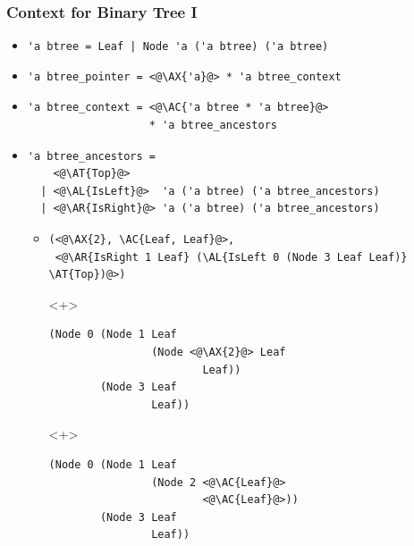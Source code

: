 \begin{frame}[fragile]
\frametitle{Context for Binary Tree I}

\newcommand{\AX}[1]{\textcolor{red}{#1}}
\newcommand{\AC}[1]{\textcolor{blue}{#1}}
\newcommand{\AL}[1]{\textcolor[RGB]{0,170,0}{#1}}
\newcommand{\AR}[1]{\textcolor{cyan}{#1}}
\newcommand{\AT}[1]{\textcolor{gray}{#1}}

\begin{itemize}[<+->]
\item \lstinline.'a btree = Leaf | Node 'a ('a btree) ('a btree).

\item
\begin{lstlisting}
'a btree_pointer = <@\AX{'a}@> * 'a btree_context
\end{lstlisting}

\item
\begin{lstlisting}
'a btree_context = <@\AC{'a btree * 'a btree}@>
                   * 'a btree_ancestors
\end{lstlisting}

\item
\begin{lstlisting}
'a btree_ancestors =
    <@\AT{Top}@>
  | <@\AL{IsLeft}@>  'a ('a btree) ('a btree_ancestors)
  | <@\AR{IsRight}@> 'a ('a btree) ('a btree_ancestors)
\end{lstlisting}

\begin{itemize}
\item
\begin{lstlisting}
(<@\AX{2}, \AC{Leaf, Leaf}@>,
 <@\AR{IsRight 1 Leaf} (\AL{IsLeft 0 (Node 3 Leaf Leaf)} \AT{Top})@>)
\end{lstlisting}

\begin{onlyenv}<+>
\begin{lstlisting}
(Node 0 (Node 1 Leaf
                (Node <@\AX{2}@> Leaf
                        Leaf))
        (Node 3 Leaf
                Leaf))
\end{lstlisting}
\end{onlyenv}

\begin{onlyenv}<+>
\begin{lstlisting}
(Node 0 (Node 1 Leaf
                (Node 2 <@\AC{Leaf}@>
                        <@\AC{Leaf}@>))
        (Node 3 Leaf
                Leaf))
\end{lstlisting}
\end{onlyenv}


\end{itemize}
\end{itemize}
\end{frame}
